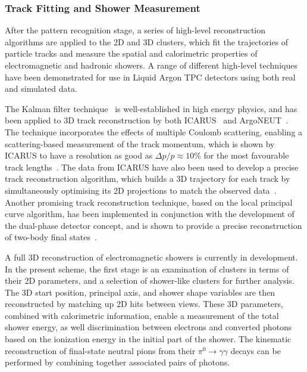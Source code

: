 \subsubsection{Track Fitting and Shower Measurement}


After the pattern recognition stage, a series of high-level reconstruction
algorithms are applied to the 2D and 3D clusters,
which fit the trajectories of particle tracks and measure the
spatial and calorimetric properties of electromagnetic and hadronic showers.
A range of different high-level techniques have been demonstrated 
for use in Liquid Argon TPC detectors using both real and simulated data.

The Kalman filter technique~\cite{kalman} is well-established in high energy physics,
and has been applied to 3D track reconstruction by both ICARUS~\cite{Ankowski:2006ts} and ArgoNEUT~\cite{REF}.
The technique incorporates the effects of multiple Coulomb scattering,
enabling a scattering-based measurement of the track momentum,
which is shown by ICARUS to have a resolution as good as $\Delta p/p \approx 10\%$ 
for the most favourable track lengths~\cite{Ankowski:2006ts}.
The data from ICARUS have also been used to develop a precise
track reconstruction algorithm, which builds a 3D trajectory for each track by simultaneously
optimising its 2D projections to match the observed data~\cite{Antonello:2012hu}.
Another promising track reconstruction technique, based on the local principal curve algorithm,
has been implemented in conjunction with the development of the 
dual-phase detector concept, and is shown to provide 
a precise reconstruction of two-body final states~\cite{Back:2013cva,LAGUNA-LBNO-deliv}. 

A full 3D reconstruction of electromagnetic showers is currently in development.
In the present scheme, the first stage is an examination of clusters 
in terms of their 2D parameters, and a selection of shower-like clusters 
for further analysis. The 3D start position, principal axis,
and shower shape variables are then reconstructed by matching up 2D hits between views.
These 3D parameters, combined with calorimetric information, enable a measurement
of the total shower energy, as well discrimination between electrons
and converted photons based on the ionization energy in the initial part of
the shower. The kinematic reconstruction of final-state neutral pions from their
$\pi^{0} \rightarrow \gamma\gamma$ decays can be performed by 
combining together associated pairs of photons.


